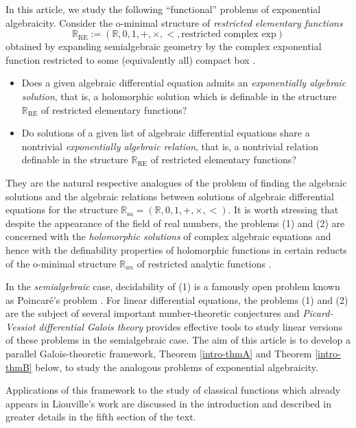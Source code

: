 \documentclass[12pt]{amsart}
\theoremstyle{definition}
\theoremstyle{plain}
\theoremstyle{exampstyle}\newtheorem{thmx}{Theorem}
\theoremstyle{exampstyle}\newtheorem{thmxbis}{Theorem}
\begin{document}
In this article, we study the following ``functional'' problems of exponential algebraicity. Consider the o-minimal structure of {\em restricted elementary functions} $$\mathbb{R}_{\mathrm{RE}} := (\mathbb{R}, 0,1,+,\times, < , \text{restricted complex exp})$$  obtained by expanding semialgebraic geometry by the complex exponential function restricted to some (equivalently all) compact box \cite{vandenDries}. 
\begin{itemize}
\item[(1)] Does a given algebraic differential equation admits an  {\em exponentially algebraic solution}, that is, a holomorphic solution which is definable in the structure $\mathbb{R}_{\mathrm{RE}}$ of restricted elementary functions?
\item[(2)] Do solutions of a given list of algebraic differential equations share a nontrivial {\em exponentially algebraic relation}, that is, a nontrivial relation definable in the structure $\mathbb{R}_{\mathrm{RE}}$ of restricted elementary functions?
\end{itemize}
They are the natural respective analogues of the problem of finding the algebraic solutions and the algebraic relations between solutions of algebraic differential equations for the structure $\mathbb{R}_{\mathrm{sa}} = (\mathbb{R}, 0,1,+,\times, <)$. It is worth stressing that despite the appearance of the field of real numbers, the problems (1) and (2) are concerned with the {\em holomorphic solutions} of complex algebraic equations and hence with the definability properties of holomorphic functions in certain reducts of the o-minimal structure $\mathbb{R}_{an}$ of restricted analytic functions \cite{Wilkie}.  

In the {\em semialgebraic} case, decidability of (1) is a famously open problem known as Poincaré's problem \cite{Poincare}. For linear differential equations, the problems (1) and (2) are the subject of several important number-theoretic conjectures and {\em Picard-Vessiot differential Galois theory} \cite{vdP-Singer} provides effective tools to study linear versions of these problems in the semialgebraic case. The aim of this article is to develop a parallel Galois-theoretic framework, Theorem \ref{intro-thmA} and Theorem \ref{intro-thmB} below, to study the analogous problems of exponential algebraicity. 

Applications of this framework to the study of classical functions which already appears in Liouville's work \cite{Liouville2,Liouville} are discussed in the introduction and described in greater details in the fifth section of the text. 
\end{document}
